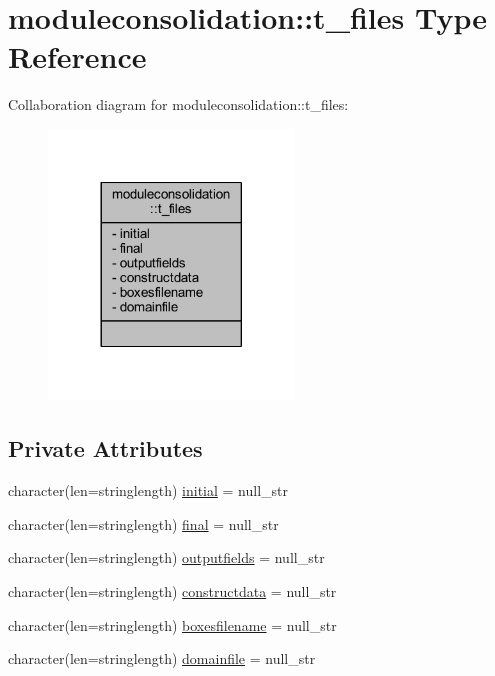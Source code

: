\hypertarget{structmoduleconsolidation_1_1t__files}{}\section{moduleconsolidation\+:\+:t\+\_\+files Type Reference}
\label{structmoduleconsolidation_1_1t__files}


Collaboration diagram for moduleconsolidation\+:\+:t\+\_\+files\+:\nopagebreak
\begin{figure}[H]
\begin{center}
\leavevmode
\includegraphics[width=185pt]{structmoduleconsolidation_1_1t__files__coll__graph}
\end{center}
\end{figure}
\subsection*{Private Attributes}
\begin{DoxyCompactItemize}
\item 
character(len=stringlength) \mbox{\hyperlink{structmoduleconsolidation_1_1t__files_a705461d9487c28c06adbe703480fee17}{initial}} = null\+\_\+str
\item 
character(len=stringlength) \mbox{\hyperlink{structmoduleconsolidation_1_1t__files_abf1d5e3f655b557a6680e18067f8a309}{final}} = null\+\_\+str
\item 
character(len=stringlength) \mbox{\hyperlink{structmoduleconsolidation_1_1t__files_ae3aa999031708df52640b8c3223b3298}{outputfields}} = null\+\_\+str
\item 
character(len=stringlength) \mbox{\hyperlink{structmoduleconsolidation_1_1t__files_a9bdcf23f9fc4044cca0035c8e9d7a36d}{constructdata}} = null\+\_\+str
\item 
character(len=stringlength) \mbox{\hyperlink{structmoduleconsolidation_1_1t__files_a39ae247a48375c1438235056bf5d6c7d}{boxesfilename}} = null\+\_\+str
\item 
character(len=stringlength) \mbox{\hyperlink{structmoduleconsolidation_1_1t__files_aa476d713f3fc3e904f7d19824d54b534}{domainfile}} = null\+\_\+str
\end{DoxyCompactItemize}


